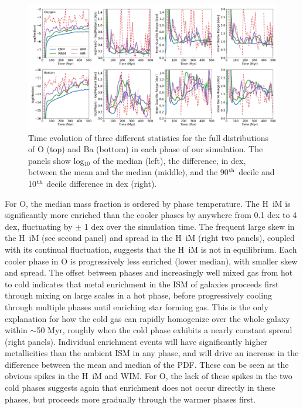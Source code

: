 \documentclass[twocolumn]{aastex61}
\begin{document}
\begin{figure}
\centering
\includegraphics[width=0.95\linewidth]{O_Ba_distribution_evolution.png}
\caption{Time evolution of three different statistics for the full distributions of O (top) and Ba (bottom) in each phase of our simulation. The panels show log$_{10}$ of the median (left), the difference, in dex, between the mean and the median (middle), and the 90$^{\rm th}$ decile and 10$^{\rm th}$ decile difference in dex (right).}
\label{fig:phase-statistics}
\end{figure}

For O, the median mass fraction is ordered by phase temperature. The H~{\sc i}M is significantly more enriched than the cooler phases by anywhere from 0.1 dex to 4 dex, fluctuating by $\pm$ 1 dex over the simulation time. The frequent large skew in the H~{\sc i}M (see second panel) and spread in the H~{\sc i}M (right two panels), coupled with its continual fluctuation, suggests that the H~{\sc i}M is not in equilibrium.
Each cooler phase in O is progressively less enriched (lower median), with smaller skew and spread. The offset between phases and increasingly well mixed gas from hot to cold indicates that metal enrichment in the ISM of galaxies proceeds first through mixing on large scales in a hot phase, before progressively cooling through multiple phases until enriching star forming gas. This is the only explanation for how the cold gas can rapidly homogenize over the whole galaxy within $\sim$50 Myr, roughly when the cold phase exhibits a nearly constant spread (right panels). Individual enrichment events will have significantly higher metallicities than the ambient ISM in any phase, and will drive an increase in the difference between the mean and median of the PDF. These can be seen as the obvious spikes in the H~{\sc i}M and WIM. For O, the lack of these spikes in the two cold phases suggests again that enrichment does not occur directly in these phases, but proceeds more gradually through the warmer phases first.
\end{document}
